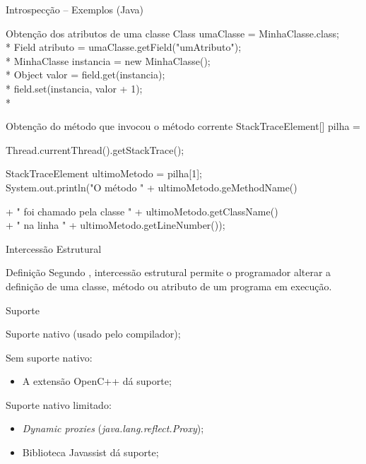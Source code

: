 \documentclass[12pt,t]{beamer}
\begin{document}
 	 \begin{frame}{Introspecção -- Exemplos (Java)}
 	 	\begin{exampleblock}{Obtenção dos atributos de uma classe}
 	 		Class umaClasse = MinhaClasse.class; \\*
			Field atributo = umaClasse.getField("umAtributo"); \\*
			MinhaClasse instancia = new MinhaClasse(); \\*
			Object valor = field.get(instancia); \\*
			field.set(instancia, valor + 1); \\*
 	 	\end{exampleblock}
 	 	\begin{exampleblock}{Obtenção do método que invocou o método corrente}
 	 		StackTraceElement[] pilha = \\
 	 		\begin{adjustwidth}{2.5em}{0pt}
 	 			Thread.currentThread().getStackTrace(); \\
			\end{adjustwidth}
 	 		StackTraceElement ultimoMetodo = pilha[1]; \\
 	 		System.out.println("O método " + ultimoMetodo.geMethodName()\\
 	 		\begin{adjustwidth}{2.5em}{0pt}
		    	 + " foi chamado pela classe " + ultimoMetodo.getClassName()\\
				 + " na linha " + ultimoMetodo.getLineNumber()); \\
		    \end{adjustwidth}
 	 	\end{exampleblock}
 	 \end{frame}
 	 \begin{frame}{Intercessão Estrutural}
 	 	\begin{block}{Definição}
 	 		Segundo , intercessão estrutural permite o programador alterar a definição de uma classe, método ou atributo de um programa em execução.
 	 	\end{block} 	 	
 	 	\begin{block}{Suporte}
 	 		\begin{description}[Smalltalk:]
 	 			\item [Smalltalk:] Suporte nativo (usado pelo compilador);
 	 			\item [C++:] Sem suporte nativo:  
 	 				\begin{itemize}
		 	 			\item A extensão OpenC++ \cite{chiba1995metaobject} dá suporte;
		 	 		\end{itemize}
 	 			\item [Java:] Suporte nativo limitado:
	 	 			\begin{itemize}
	 	 				\item \emph{Dynamic proxies} (\emph{java.lang.reflect.Proxy});
	 	 				\item Biblioteca Javassist \cite{chiba2000load} dá suporte;
	 	 			\end{itemize}
 	 		\end{description}
 	 	\end{block}
 	 \end{frame}
\end{document}
